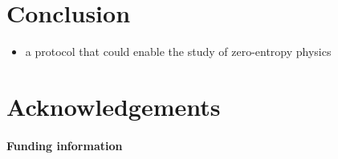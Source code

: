 \documentclass[submission, Phys]{SciPost}
\begin{document}

\section{Conclusion}
\begin{itemize}
    \item a protocol that could enable the study of zero-entropy physics
\end{itemize}

\section*{Acknowledgements}


\paragraph{Funding information}
\end{document}
